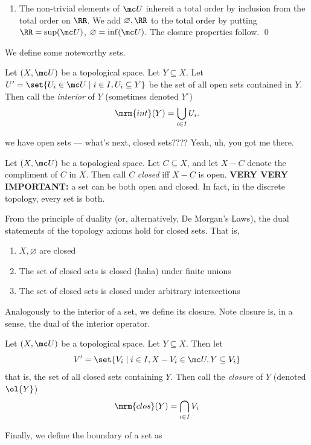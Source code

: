 \documentclass{fkbook}
\theoremstyle{snazzydefinition}
\begin{document}
\begin{adjustwidth}{1em}{1em}
\begin{enumerate}[label=\arabic*.]
    \item The non-trivial elements of $\mc U$ inhereit a total order
      by inclusion from the total order on $\RR$. We add $\varnothing,
      \RR$ to the total order by putting $\RR = \sup (\mc U)$,
      $\varnothing = \inf (\mc U)$. The closure properties follow.
      \qed
  \end{enumerate}
  We define some noteworthy sets.
  \begin{definition}[Interior]
    Let $(X, \mc U)$ be a topological space. Let $Y \subseteq X$. Let
    $U' = \set{U_i \in \mc U \mid i \in I, U_i \subseteq Y}$ be the
    set of all open sets contained in $Y$. Then call the
    \emph{interior} of $Y$ (sometimes denoted $Y^\circ$)
    \[
      \mrm{int}(Y) = \bigcup_{i \in I} U_i.
    \]
  \end{definition}
  we have open sets --- what's next, closed sets???? Yeah, uh, you got
  me there.
  \begin{definition}
    Let $(X, \mc U)$ be a topological space. Let $C \subseteq X$, and
    let $X - C$ denote the compliment of $C$ in $X$. Then call $C$
    \emph{closed} iff $X - C$ is open. \textbf{VERY VERY IMPORTANT:}
    a set can be both open and closed. In fact, in the discrete
    topology, every set is both.
  \end{definition}
  From the principle of duality (or, alternatively, De Morgan's Laws),
  the dual statements of the topology axioms hold for closed sets.
  That is,
  \begin{enumerate}[label=\roman*.]
    \item $X, \varnothing$ are closed
    \item The set of closed sets is closed (haha) under finite unions
    \item The set of closed sets is closed under arbitrary
      intersections
  \end{enumerate}
  Analogously to the interior of a set, we define its closure. Note
  closure is, in a sense, the dual of the interior
  operator.
  \begin{definition}
    Let $(X, \mc U)$ be a topological space. Let $Y \subseteq X$. Then
    let
    \[
      V' = \set{V_i \mid i \in I, X - V_i \in \mc U, Y \subseteq V_i}
    \]
    that is, the set of all closed sets containing $Y$. Then call the
    \emph{closure} of $Y$ (denoted $\ol{Y}$)
    \[
      \mrm{clos}(Y) = \bigcap_{i \in I} V_i
    \]
  \end{definition}
  Finally, we define the boundary of a set as
  \begin{definition}

\end{definition}
\end{adjustwidth}
\end{document}
